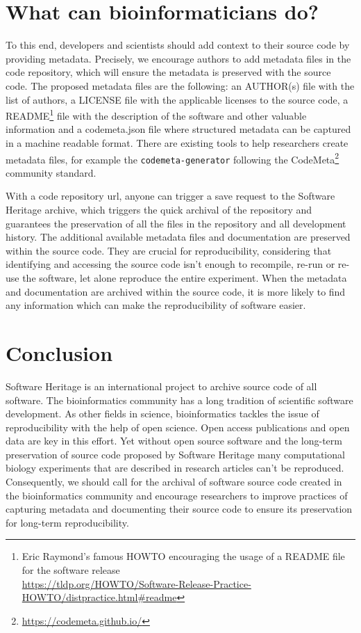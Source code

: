 \documentclass[long, final]{jobim}
\begin{document}
\section{What can bioinformaticians do?}

To this end, developers and scientists should add context to their source code by providing metadata. Precisely, we encourage authors to add metadata files in the code repository, which will ensure the metadata is preserved with the source code. The proposed metadata files are the following: an AUTHOR(s) file with the list of authors, a LICENSE file with the applicable licenses to the source code, a README\footnote{Eric Raymond's famous HOWTO encouraging the usage of a README file for the software release\\ 
\url{ https://tldp.org/HOWTO/Software-Release-Practice-HOWTO/distpractice.html\#readme}} file with the description of the software and other valuable information and a codemeta.json file where structured metadata can be captured in a machine readable format. There are existing tools to help researchers create metadata files, for example the \texttt{codemeta-generator}\cite{codemetagenerator} following the CodeMeta\footnote{\url{https://codemeta.github.io/}} community standard. 

With a code repository url, anyone can trigger a save request to the Software Heritage archive, which triggers the quick archival of the repository and guarantees the preservation of all the files in the repository and all development history. The additional available metadata files and documentation are preserved within the source code. They are crucial for reproducibility, considering that identifying and accessing the source code isn’t enough to recompile, re-run or re-use the software, let alone reproduce the entire experiment. When the metadata and documentation are archived within the source code, it is more likely to find any information which can make the reproducibility of software easier.


\section{Conclusion}

Software Heritage is an international project to archive source code of all software. The bioinformatics community has a long tradition of scientific software development. As other fields in science, bioinformatics tackles the issue of reproducibility with the help of open science. Open access publications and open data are key in this effort. Yet without open source software and the long-term preservation of source code proposed by Software Heritage many computational biology experiments that are described in research articles can’t be reproduced. Consequently, we should call for the archival of software source code created in the bioinformatics community and encourage researchers to improve practices of capturing metadata and documenting their source code to ensure its preservation for long-term reproducibility.


\printbibliography
\end{document}
